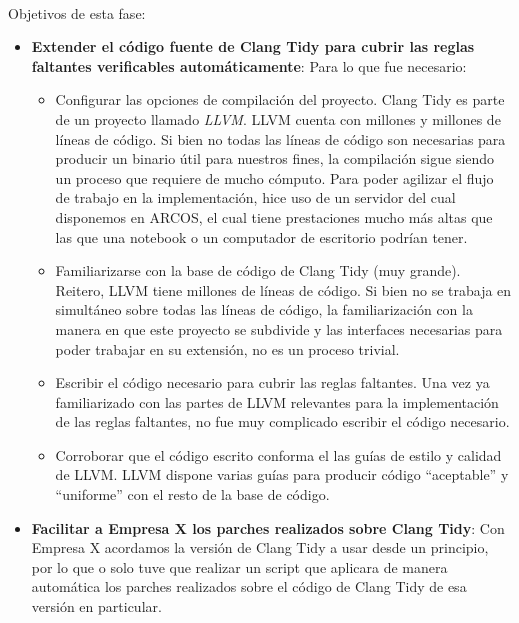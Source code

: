 \documentclass[12pt]{extreport} %
\begin{document}
\paragraph{}
Objetivos de esta fase:
\begin{itemize}
\item \textbf{Extender el código fuente de Clang Tidy para cubrir las
  reglas faltantes verificables automáticamente}: Para lo que fue
  necesario:
  \begin{itemize}
  \item Configurar las opciones de compilación del proyecto. Clang
    Tidy es parte de un proyecto llamado \emph{LLVM}. LLVM cuenta con
    millones y millones de líneas de código. Si bien no todas las
    líneas de código son necesarias para producir un binario útil para
    nuestros fines, la compilación sigue siendo un proceso que
    requiere de mucho cómputo. Para poder agilizar el flujo de trabajo
    en la implementación, hice uso de un servidor del cual disponemos
    en ARCOS, el cual tiene prestaciones mucho más altas que las que
    una notebook o un computador de escritorio podrían tener.
  \item Familiarizarse con la base de código de Clang Tidy (muy
    grande). Reitero, LLVM tiene millones de líneas de código. Si bien
    no se trabaja en simultáneo sobre todas las líneas de código, la
    familiarización con la manera en que este proyecto se subdivide y
    las interfaces necesarias para poder trabajar en su extensión, no
    es un proceso trivial.
  \item Escribir el código necesario para cubrir las reglas
    faltantes. Una vez ya familiarizado con las partes de LLVM
    relevantes para la implementación de las reglas faltantes, no fue
    muy complicado escribir el código necesario.
  \item Corroborar que el código escrito conforma el las guías de
    estilo y calidad de LLVM. LLVM dispone varias guías para producir
    código ``aceptable'' y ``uniforme'' con el resto de la base de
    código.
  \end{itemize}
\item \textbf{Facilitar a Empresa X los parches realizados sobre Clang
  Tidy}: Con Empresa X acordamos la versión de Clang Tidy a usar desde
  un principio, por lo que o solo tuve que realizar un script que
  aplicara de manera automática los parches realizados sobre el código
  de Clang Tidy de esa versión en particular.
\end{itemize}
\end{document}
